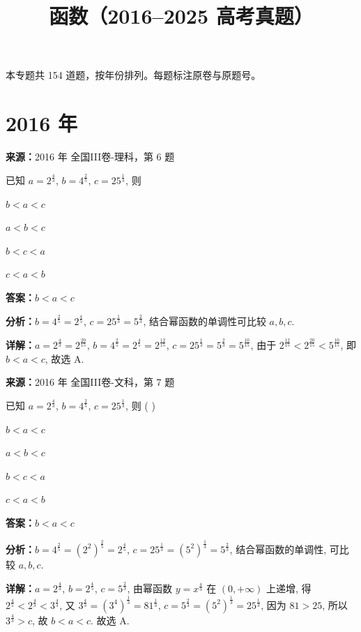 ﻿\title{函数（2016--2025 高考真题）}
\author{}
\date{}
\maketitle
\noindent 本专题共 154 道题，按年份排列。每题标注原卷与原题号。

\section*{2016 年}

\begin{question}[points=5]
\textbf{来源：}2016 年 全国III卷-理科，第 6 题\par
已知 $a=2^{\frac{4}{3}}$, $b=4^{\frac{2}{5}}$, $c=25^{\frac{1}{3}}$, 则
\begin{choices}
  \item $b<a<c$
  \item $a<b<c$
  \item $b<c<a$
  \item $c<a<b$
\end{choices}
\begin{solution}
\textbf{答案：}$b<a<c$

\textbf{分析：}$b=4^{\frac{2}{5}}=2^{\frac{4}{5}}$, $c=25^{\frac{1}{3}}=5^{\frac{2}{3}}$, 结合幂函数的单调性可比较 $a,b,c$.

\textbf{详解：}$a=2^{\frac{4}{3}}=2^{\frac{20}{15}}$, $b=4^{\frac{2}{5}}=2^{\frac{4}{5}}=2^{\frac{12}{15}}$, $c=25^{\frac{1}{3}}=5^{\frac{2}{3}}=5^{\frac{10}{15}}$, 由于 $2^{\frac{12}{15}}<2^{\frac{20}{15}}<5^{\frac{10}{15}}$, 即 $b<a<c$, 故选 A.
\end{solution}
\end{question}

\begin{question}[points=5]
\textbf{来源：}2016 年 全国III卷-文科，第 7 题\par
已知 $a=2^{\frac{4}{3}}$, $b=4^{\frac{2}{5}}$, $c=25^{\frac{1}{3}}$, 则 ( )
\begin{choices}
  \item $b<a<c$
  \item $a<b<c$
  \item $b<c<a$
  \item $c<a<b$
\end{choices}
\begin{solution}
\textbf{答案：}$b<a<c$

\textbf{分析：}$b=4^{\frac{2}{5}}=(2^2)^{\frac{2}{5}}=2^{\frac{4}{5}}$, $c=25^{\frac{1}{3}}=(5^2)^{\frac{1}{3}}=5^{\frac{2}{3}}$, 结合幂函数的单调性, 可比较 $a,b,c$.

\textbf{详解：}$a=2^{\frac{4}{3}}$, $b=2^{\frac{4}{5}}$, $c=5^{\frac{2}{3}}$, 由幂函数 $y=x^{\frac{4}{3}}$ 在 $(0,+\infty)$ 上递增, 得 $2^{\frac{4}{5}}<2^{\frac{4}{3}}<3^{\frac{4}{3}}$, 又 $3^{\frac{4}{3}}=(3^4)^{\frac{1}{3}}=81^{\frac{1}{3}}$, $c=5^{\frac{2}{3}}=(5^2)^{\frac{1}{3}}=25^{\frac{1}{3}}$, 因为 $81>25$, 所以 $3^{\frac{4}{3}}>c$, 故 $b<a<c$. 故选 A.
\end{solution}
\end{question}

